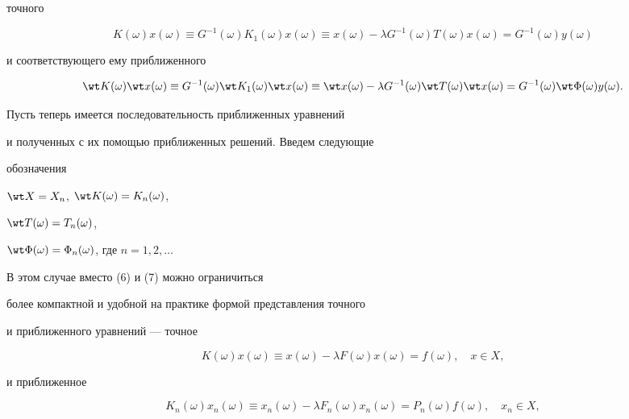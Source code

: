 точного


\begin{equation}


K(\omega)x(\omega)\equiv G^{-1}(\omega)K_1(\omega)x(\omega)


\equiv x(\omega)-\lambda G^{-1}(\omega)T(\omega)x(\omega)=


G^{-1}(\omega)y(\omega)


\end{equation}


и соответствующего ему приближенного


\begin{equation}


\wt K(\omega)\wt x(\omega)\equiv G^{-1}(\omega)\wt K_1(\omega)


\wt x(\omega)


\equiv \wt x(\omega)-\lambda G^{-1}(\omega)\wt T(\omega)\wt x(\omega)=


G^{-1}(\omega)\wt\Phi(\omega)y(\omega).


\end{equation}





Пусть теперь имеется последовательность приближенных уравнений


и полученных с их помощью приближенных решений. Введем следующие


обозначения


$\wt X=X_n$, $\wt K(\omega)=K_n(\omega)$,


$\wt T(\omega)=T_n(\omega)$,


$\wt\Phi(\omega)=\Phi_n(\omega)$, где $n=1,2,\dotsc$


В этом случае вместо (6) и (7) можно ограничиться


более компактной и удобной на практике формой представления точного


и приближенного уравнений --- точное


\begin{equation}


K(\omega)x(\omega)\equiv x(\omega)-\lambda F(\omega)


x(\omega)=f(\omega),\quad x\in X,


\end{equation}


и приближенное


\begin{equation}


K_n(\omega)x_n(\omega)\equiv x_n(\omega)-


\lambda F_n(\omega)x_n(\omega)=P_n(\omega)f(\omega),\quad


x_n\in X,


\end{equation}


